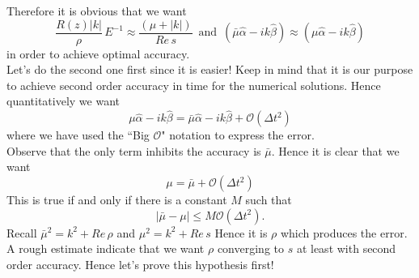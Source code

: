 Therefore it is obvious that we want 
\begin{equation}
\dfrac{R(z) |k|}{\rho} \, E^{-1} \approx \dfrac{(\mu + |k|)}{Re \, s} \, \text{ and } \, (\bar{\mu} \hat{\alpha} - ik \hat{\beta}) \approx (\mu \hat{\alpha} - ik \hat{\beta})
\end{equation}
in order to achieve optimal accuracy.\\

Let's do the second one first since it is easier! Keep in mind that it is our purpose to achieve second order accuracy in time for the numerical solutions. Hence quantitatively we want
\begin{equation*}
\mu \hat{\alpha} - ik \hat{\beta} = \bar{\mu} \hat{\alpha} - ik \hat{\beta} + \mathcal{O}(\Delta t^2)
\end{equation*}
where we have used the ``Big $\mathcal{O}$" notation to express the error.\\
Observe that the only term inhibits the accuracy is $\bar{\mu}$. Hence it is clear that we want
\begin{equation*}
\mu = \bar{\mu} + \mathcal{O}(\Delta t^2)
\end{equation*}
This is true if and only if there is a constant $M$ such that 
\begin{equation*}
|\bar{\mu} - \mu| \leq M \mathcal{O} (\Delta t^2).
\end{equation*}
Recall $\bar{\mu}^2 = k^2 + Re \, \rho$ and  $\mu^2 = k^2 + Re \, s$
Hence it is $\rho$ which produces the error. A rough estimate indicate that we want $\rho$ converging to $s$ at least with second order accuracy. Hence let's prove this hypothesis first!

